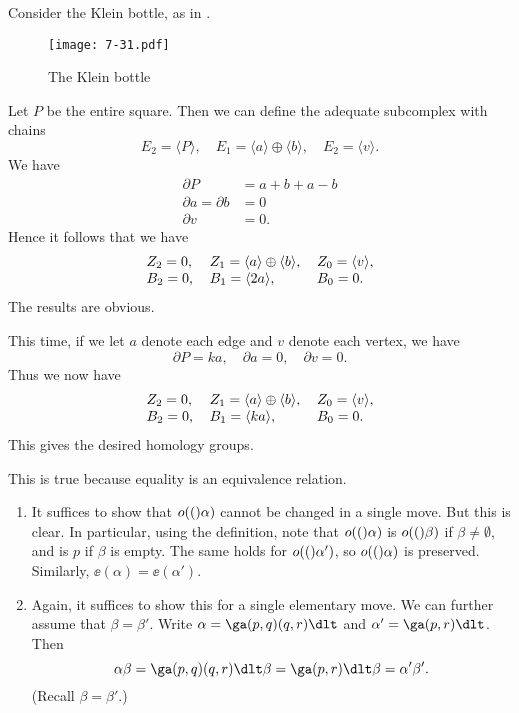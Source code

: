 \documentclass[../../solutions.tex]{subfiles}
\begin{document}
\begin{exercise} \leavevmode
Consider the Klein bottle, as in .
\begin{figure}[htbp]
\centering
\texttt{[image: 7-31.pdf]}
\caption{The Klein bottle}
\label{fig:7-31}
\end{figure}
Let $P$ be the entire square.
Then we can define the adequate subcomplex with chains
\[E_2=\langle P\rangle,\quad E_1=\langle a\rangle\oplus\langle b\rangle,\quad E_2=\langle v\rangle.\]
We have
\begin{align*}
\partial P&=a+b+a-b\\
\partial a=\partial b&=0\\
\partial v&=0.
\end{align*}
Hence it follows that we have
\[
\begin{tabular}{l l l}
$Z_2=0$, & $Z_1=\langle a\rangle\oplus\langle b\rangle$, & $Z_0=\langle v\rangle$, \\
$B_2=0$, & $B_1=\langle2a\rangle$, & $B_0=0$.
\end{tabular}
\]
The results are obvious.
\end{exercise}

\begin{exercise} \leavevmode
This time, if we let $a$ denote each edge and $v$ denote each vertex, we have
\[\partial P=ka,\quad\partial a=0,\quad\partial v=0.\]
Thus we now have
\[
\begin{tabular}{l l l}
$Z_2=0$, & $Z_1=\langle a\rangle\oplus\langle b\rangle$, & $Z_0=\langle v\rangle$, \\
$B_2=0$, & $B_1=\langle ka\rangle$, & $B_0=0$.
\end{tabular}
\]
This gives the desired homology groups.
\end{exercise}

\begin{exercise} \leavevmode
This is true because equality is an equivalence relation.
\end{exercise}

\begin{exercise} \leavevmode
\begin{enumerate}
\item
It suffices to show that $o(()\alpha)$ cannot be changed in a single move.
But this is clear.
In particular, using the definition, note that $o(()\alpha)$ is $o(()\beta)$ if $\beta\ne\emptyset$, and is $p$ if $\beta$ is empty.
The same holds for $o(()\alpha')$, so $o(()\alpha)$ is preserved.
Similarly, $\ee(\alpha)=\ee(\alpha')$.

\item
Again, it suffices to show this for a single elementary move.
We can further assume that $\beta=\beta'$.
Write $\alpha=\ga(p,q)(q,r)\dlt$ and $\alpha'=\ga(p,r)\dlt$.
Then
\[\alpha\beta=\ga(p,q)(q,r)\dlt\beta=\ga(p,r)\dlt\beta=\alpha'\beta'.\]
(Recall $\beta=\beta'$.)
\end{enumerate}
\end{exercise}
\end{document}
